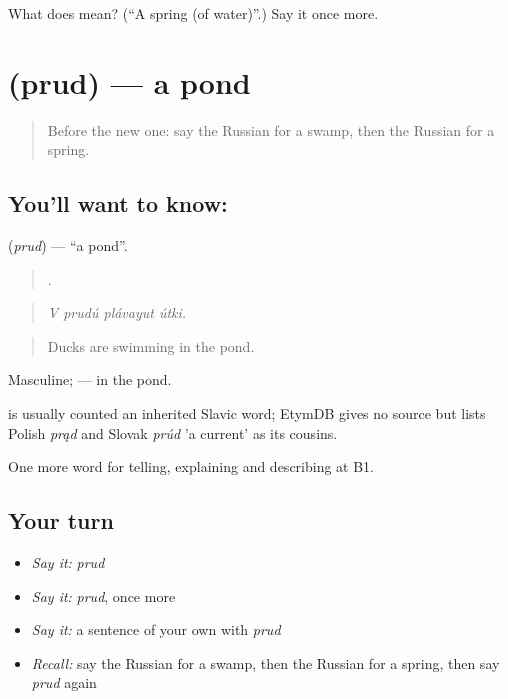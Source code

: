 \begin{tcolorbox}[breakable,colback=teal!4,colframe=teal!35!black,title={Before you move on}]
What does  mean? (\textquotedblleft{}A spring (of water)\textquotedblright{}.) Say it once more.
\end{tcolorbox}
\section[\texorpdfstring{\ru{пруд} (prud)}{пруд (prud)}]{ (prud) — a pond}

\label{lesson:RU-C460-prud}



\begin{quote}
Before the new one: say the Russian for a swamp, then the Russian for a spring.
\end{quote}

\subsection*{You'll want to know: }
\textbf{} (\emph{prud}) — \textquotedblleft{}a pond\textquotedblright{}.

\begin{quote}
   .
\end{quote}

\begin{quote}
\emph{V prudú plávayut útki.}
\end{quote}

\begin{quote}
Ducks are swimming in the pond.
\end{quote}

Masculine; \emph{ } — in the pond.

\begin{cousinweb}
\emph{} is usually counted an inherited Slavic word; EtymDB gives no source but lists Polish \emph{prąd} and Slovak \emph{prúd} 'a current' as its cousins.
\end{cousinweb}

\begin{grammarlens}[title={What you've built}]
One more word for telling, explaining and describing at B1.
\end{grammarlens}

\subsection*{Your turn}
\begin{itemize}
\raggedright
  \item \emph{Say it:} \emph{prud}
  \item \emph{Say it:} \emph{prud}, once more
  \item \emph{Say it:} a sentence of your own with \emph{prud}
  \item \emph{Recall:} say the Russian for a swamp, then the Russian for a spring, then say \emph{prud} again
\end{itemize}

